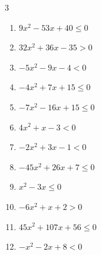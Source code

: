 \begin{multicols}{3}
\begin{enumerate}

  \item $9x^{2}-53x+40\leq 0$


  \item $32x^{2}+36x-35>0$


  \item $-5x^{2}-9x-4<0$


  \item $-4x^{2}+7x+15\leq 0$


  \item $-7x^{2}-16x+15\leq 0$


\columnbreak %

\resetques

  \item $4x^{2}+x-3<0$


  \item $-2x^{2}+3x-1<0$


  \item $-45x^{2}+26x+7\leq 0$


  \item $x^{2}-3x\leq 0$

        \phantom{$\displaystyle 0 \leqq x \leqq 3$}

  \item $-6x^{2}+x+2>0$


  \item $45x^{2}+107x+56\leq 0$


  \item $-x^{2}-2x+8<0$


\end{enumerate}
\end{multicols}
